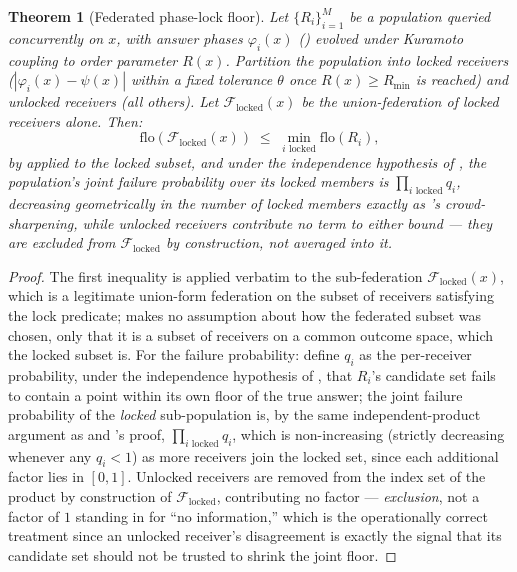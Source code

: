 \documentclass[11pt,twocolumn,a4paper]{article}
\theoremstyle{rdm}
\newtheorem{theorem}{Theorem}[section]
\theoremstyle{definition}
\theoremstyle{remark}
\newcommand{\flo}{\mathrm{flo}}
\newcommand{\Rec}{R}
\newcommand{\Fed}{\mathcal{F}}
\begin{document}
\begin{theorem}[Federated phase-lock floor]
\label{thm:phaselock-floor}
Let $\{\Rec_i\}_{i=1}^M$ be a population queried concurrently on $x$, with
answer phases $\varphi_i(x)$ () evolved under
Kuramoto coupling to order parameter $R(x)$. Partition the population into
\emph{locked} receivers ($|\varphi_i(x)-\psi(x)|$ within a fixed tolerance
$\theta$ once $R(x)\ge R_{\min}$ is reached) and \emph{unlocked} receivers
(all others). Let $\Fed_{\mathrm{locked}}(x)$ be the union-federation of
locked receivers alone. Then:
\[
\flo(\Fed_{\mathrm{locked}}(x)) \;\le\; \min_{i\text{ locked}}\flo(\Rec_i),
\]
by  applied to the locked subset, and under the
independence hypothesis of , the population's
joint failure probability over its locked members is
$\prod_{i\text{ locked}}q_i$, decreasing geometrically in the number of
locked members exactly as
\citet[Thm.~10.4]{sachikonye-split-attention}'s crowd-sharpening, while
unlocked receivers contribute \emph{no term} to either bound — they are
excluded from $\Fed_{\mathrm{locked}}$ by construction, not averaged into
it.
\end{theorem}

\begin{proof}
The first inequality is  applied verbatim to the
sub-federation $\Fed_{\mathrm{locked}}(x)$, which is a legitimate
union-form federation on the subset of receivers satisfying the lock
predicate;  makes no assumption about how the
federated subset was chosen, only that it is a subset of receivers on a
common outcome space, which the locked subset is. For the failure
probability: define $q_i$ as the per-receiver probability, under the
independence hypothesis of , that $\Rec_i$'s
candidate set fails to contain a point within its own floor of the true
answer; the joint failure probability of the \emph{locked} sub-population
is, by the same independent-product argument as
\citet[Thm.~10.4]{sachikonye-split-attention} and
's proof, $\prod_{i\text{ locked}}q_i$, which is
non-increasing (strictly decreasing whenever any $q_i<1$) as more receivers
join the locked set, since each additional factor lies in $[0,1]$.
Unlocked receivers are removed from the index set of the product by
construction of $\Fed_{\mathrm{locked}}$, contributing no factor —
\emph{exclusion}, not a factor of $1$ standing in for ``no information,''
which is the operationally correct treatment since an unlocked receiver's
disagreement is exactly the signal that its candidate set should not be
trusted to shrink the joint floor.
\end{proof}
\end{document}
